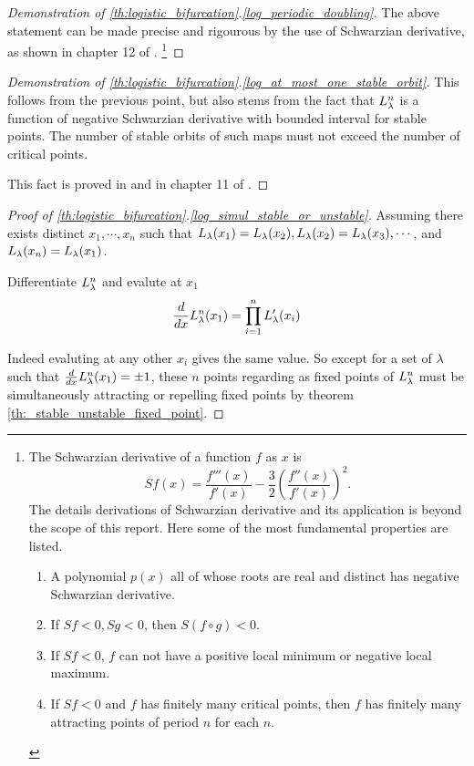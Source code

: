 \begin{proof}[Demonstration of \ref{th:logistic_bifurcation}.\ref{log_periodic_doubling}]
	The above statement can be made precise and rigourous by the use of Schwarzian derivative, as shown in chapter 12 of \cite{Devaney_green_book_chaos_definition}.
	\footnote{
		The Schwarzian derivative of a function $f$ as $x$ is 
		$$
		Sf(x) = \frac{f'''(x)}{f'(x)} - \frac{3}{2} \left(\frac{f''(x)}{f'(x)}\right)^2.
		$$
		The details derivations of Schwarzian derivative and its application is beyond the scope of this report. 
		Here some of the most fundamental properties are listed.
		\begin{enumerate}
			\item A polynomial $p(x)$ all of whose roots are real and distinct has negative Schwarzian derivative.
			\item If $Sf < 0, Sg < 0$, then $S(f\circ g) < 0$.
			\item If $Sf <0$, $f$ can not have a positive local minimum or negative local maximum.
			\item If $Sf < 0$ and $f$ has finitely many critical points, then $f$ has finitely many attracting points of period $n$ for each $n$.
		\end{enumerate}
	}
\end{proof}

\begin{proof}[Demonstration of \ref{th:logistic_bifurcation}.\ref{log_at_most_one_stable_orbit}]
	This follows from the previous point, but also stems from the fact that $L_{\lambda}^n$ is a function of negative Schwarzian derivative with bounded interval for stable points.
	The number of stable orbits of such maps must not exceed the number of critical points.

	This fact is proved in \cite{Pierre_Collet} and in chapter 11 of \cite{Devaney_green_book_chaos_definition}.
\end{proof}


\begin{proof}[Proof of \ref{th:logistic_bifurcation}.\ref{log_simul_stable_or_unstable}]
		Assuming there exists distinct $x_1, \cdots, x_n$ such that $L_{\lambda}(x_1) = L_{\lambda}(x_2), L_{\lambda}(x_2) = L_{\lambda}(x_3), \cdots $, and $L_{\lambda}(x_n) = L_{\lambda}(x_1)$.

		Differentiate $L_{\lambda}^n$ and evalute at $x_1$ 
		$$
		\frac{d}{dx} L_{\lambda}^n(x_1) = \prod_{i=1}^n L_{\lambda}'(x_i)
		$$

		Indeed evaluting at any other $x_i$ gives the same value. 
		So except for a set of $\lambda$ such that $\frac{d}{dx} L_{\lambda}^n(x_1) = \pm 1$, these $n$ points regarding as fixed points of $L_{\lambda}^n$ must be simultaneously attracting or repelling fixed points by theorem \ref{th:_stable_unstable_fixed_point}.
\end{proof}


